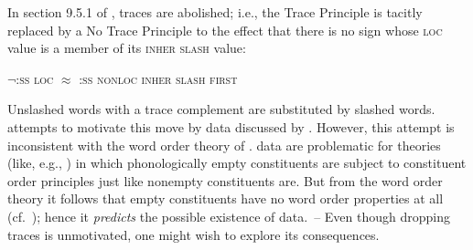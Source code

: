 \documentclass[output=paper]{LSP/langsci}
\begin{document}
\randnum\label{rn:14-6}In section 9.5.1 of \citet{PollardSagE1994}, traces are abolished; i.e., the Trace Principle is tacitly replaced by a No Trace Principle to the effect that there is no sign whose \textsc{loc} value is a member of its \textsc{inher} \textsc{slash} value:
\begin{exe}
\label{ex:14-NTP}
$\neg$:\textsc{ss} \textsc{loc} $\approx$ :\textsc{ss} \textsc{nonloc} \textsc{inher} \textsc{slash} \textsc{first}
\end{exe}
\addlines[2]
Unslashed words with a trace complement are substituted by slashed
words. \citet{PollardSagE1994} attempts to motivate this move by data discussed by
\citet{PickeringBarry1991}. However, this attempt is inconsistent with the word
order theory of .  data are problematic for theories (like,
e.g., ) in which phonologically empty constituents are subject to
constituent order principles just like nonempty constituents are. But
from the  word order theory it follows that empty constituents
have no word order properties at all (cf.\ \citealt[291f.]{Moshier1990});
hence it \textit{predicts} the possible existence of  data.~-- Even though
dropping traces is unmotivated, one might wish to explore its
consequences.
\end{document}
